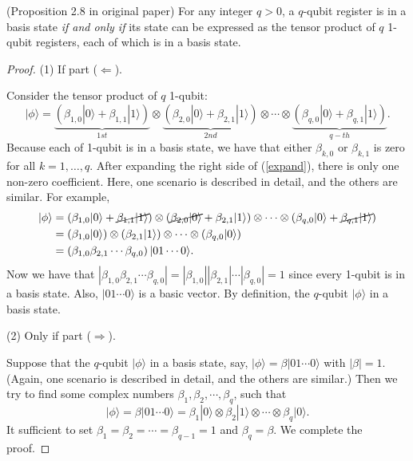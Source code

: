 \begin{proposition} (Proposition 2.8 in original paper) For any integer $q>0$, a $q$-qubit register is in a basis state \textit{if and only if} its state can be expressed as the tensor product of $q$ 1-qubit registers, each of which is in a basis state.
\end{proposition}
\begin{proof}
    
    (1) If part ($\Longleftarrow$).
    
    Consider the tensor product of $q$ 1-qubit:
    \begin{equation}\label{expand}
    |\phi\rangle=
    \underbrace{\left(\beta_{1,0}|0\rangle+\beta_{1,1}|1\rangle\right)}_{1st}
    \otimes
    \underbrace{\left(\beta_{2,0}|0\rangle+\beta_{2,1}|1\rangle\right) }_{2nd}
    \otimes    
    \cdots 
    \otimes
    \underbrace{\left(\beta_{q, 0}|0\rangle+\beta_{q, 1}|1\rangle\right)}_{q-th}
    .
    \end{equation}
    Because each of 1-qubit is in a basis state, we have that either $\beta_{k,0}$ or $\beta_{k,1}$ is zero for all $k = 1, \dots, q$. After expanding the right side of (\ref{expand}), there is only one non-zero coefficient.
    Here, one scenario is described in detail, and the others are similar. For example,
    \begin{align*}
        |\phi\rangle
        &=\left(\beta_{1,0}|0\rangle+\cancel{\beta_{1,1}|1\rangle} \right) \otimes\left(\cancel{\beta_{2,0}|0\rangle}+\beta_{2,1}|1\rangle\right) \otimes \cdots \otimes\left(\beta_{q, 0}|0\rangle+\cancel{\beta_{q, 1}|1\rangle}\right) \\
        &=\left(\beta_{1,0}|0\rangle\right)
        \otimes\left(\beta_{2,1}|1\rangle\right) 
        \otimes \cdots 
        \otimes\left(\beta_{q, 0}|0\rangle\right) \\
        &=\left(\beta_{1,0} \beta_{2,1} \cdots \beta_{q, 0} \right) |01 \cdots 0 \rangle.
    \end{align*}
    Now we have that $|\beta_{1,0} \beta_{2,1} \cdots \beta_{q, 0}|
    =|\beta_{1,0}| |\beta_{2,1}| \cdots |\beta_{q, 0}|=1$ since every 1-qubit is in a basis state.
    Also, $|01 \cdots 0 \rangle$ is a basic vector. By definition, the $q$-qubit $|\phi\rangle$ in a basis state.

    
    (2) Only if part ($\Longrightarrow$).

    Suppose that the $q$-qubit $|\phi\rangle$ in a basis state, say, $|\phi\rangle=\beta|01 \cdots 0 \rangle$ with $\left|\beta\right|=1.$ (Again, one scenario is described in detail, and the others are similar.)
    Then we try to find some complex numbers $\beta_{1}, \beta_{2}, \cdots,\beta_{q}$, such that
    \begin{equation*}
        |\phi\rangle=\beta|01 \cdots 0 \rangle
        =\beta_{1}|0\rangle
        \otimes\beta_{2}|1\rangle
        \otimes \cdots 
        \otimes\beta_{q}|0\rangle.
    \end{equation*}
    It sufficient to set $\beta_{1}=\beta_{2}=\cdots=\beta_{q-1}=1$ and $\beta_{q}=\beta$.
    We complete the proof.
\end{proof}